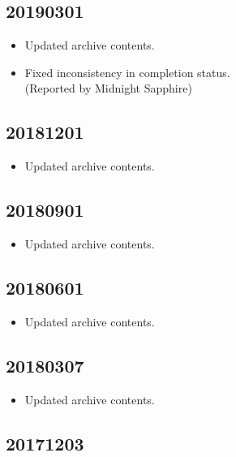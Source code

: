 \documentclass[hidelinks,a4paper,12pt]{article}
\begin{document}
\subsection{20190301}  \label{sec:changelog_20190301}

\begin{itemize}
\item Updated archive contents.
\item Fixed inconsistency in completion status.
  \\ (Reported by Midnight Sapphire)
\end{itemize}

\subsection{20181201}  \label{sec:changelog_20181201}

\begin{itemize}
\item Updated archive contents.
\end{itemize}

\subsection{20180901}  \label{sec:changelog_20180901}

\begin{itemize}
\item Updated archive contents.
\end{itemize}

\subsection{20180601}  \label{sec:changelog_20180601}

\begin{itemize}
\item Updated archive contents.
\end{itemize}

\subsection{20180307}  \label{sec:changelog_20180307}

\begin{itemize}
\item Updated archive contents.
\end{itemize}

\subsection{20171203}  \label{sec:changelog_20171203}
\end{document}
